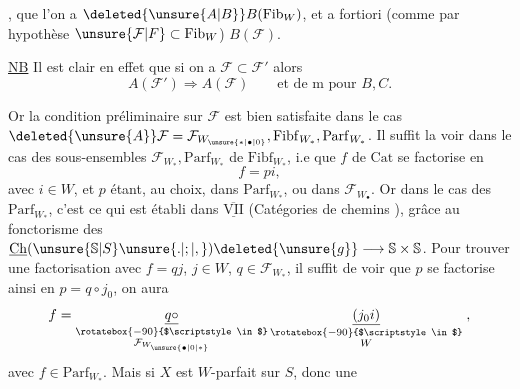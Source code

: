 
, que l'on a $\deleted{\unsure{A|B}}B(\mathrm{Fib}_{W})$, et a fortiori (comme par hypothèse $\unsure{\mathcal{F}|F}\subset\mathrm{Fib}_{W}$) $B(\mathcal{F})$.

\uline{NB} Il est clair en effet que si on a $\mathcal{F}\subset\mathcal{F}'$ alors
\[
 A(\mathcal{F}')\Longrightarrow A(\mathcal{F}) \qquad
 \text{et de \={m} pour }B,C. \tag*{(*)}
\]

Or la condition préliminaire sur $\mathcal{F}$ est bien satisfaite dans le cas  $\deleted{\unsure{A}}\mathcal{F}=\mathcal{F}_{W_{\unsure{*|\bullet|0}}},\mathrm{Fibf}_{W_*},\mathrm{Parf}_{W_*}$. Il suffit  la voir dans le cas des sous-ensembles $\mathcal{F}_{W_*},\mathrm{Parf}_{W_*}$ de $\mathrm{Fibf}_{W_*}$, i.e que   $f$ de $\mathrm{Cat}$ se factorise en
\[
 f=pi,
\]
avec $i\in W$, et $p$ étant, au choix, dans $\mathrm{Parf}_{W_*}$, ou dans $\mathcal{F}_{W_{\bullet}}$. Or dans le cas des $\mathrm{Parf}_{W_*}$, \margin{$\Vert$} c'est ce qui est établi dans $\overline{\underline{\mathrm{VII}}}$ (Catégories de chemins ), grâce au fonctorisme des $\underline{\mathrm{Ch}}(\unsure{\mathbb{S}|S}\unsure{.|;|,})\deleted{\unsure{g}}\longrightarrow\mathbb{S}\times\mathbb{S}$. Pour trouver une factorisation avec $f=qj$, $j\in W$, $q\in\mathcal{F}_{W_*}$, il suffit de voir que $p$ se factorise ainsi en $p=q\circ j_0$, on aura
\[
 f=\underset{\substack{\rotatebox{-90}{$\scriptstyle\in$}\\\mathcal{F}_{W_{\unsure{\bullet|0|*}}}}}{\underline{q\circ}}\,
 \underset{\substack{\rotatebox{-90}{$\scriptstyle\in$}\\W}}{\underline{(j_0i)}}\; ,
\]
 avec  $f\in\mathrm{Parf}_{W_*}$. Mais si $X$ est $W$-parfait sur $S$, donc une
